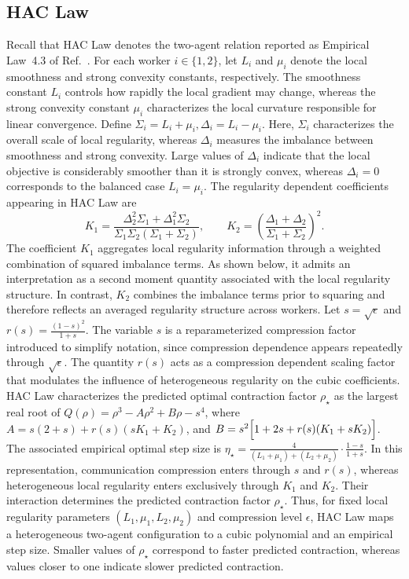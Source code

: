 \documentclass[mathematics,article,submit,moreauthors]{Definitions/mdpi}
\begin{document}
\subsection{HAC Law} \label{sec:hac-law} Recall that HAC Law denotes
the two-agent relation reported as Empirical Law~4.3 of
Ref.~\cite{thomsen2026tight}. For each worker \(i\in\{1,2\}\), let
\(L_i\) and \(\mu_i\) denote the local smoothness and strong convexity
constants, respectively. The smoothness constant \(L_i\) controls how rapidly the local gradient may change, whereas the strong convexity constant \(\mu_i\) characterizes the local curvature responsible for linear convergence. Define $\Sigma_i=L_i+\mu_i, \Delta_i=L_i-\mu_i$. Here, \(\Sigma_i\) characterizes the overall scale of local regularity, whereas \(\Delta_i\) measures the imbalance between smoothness and strong convexity. Large values of \(\Delta_i\) indicate that the local objective is considerably smoother than it is strongly convex, whereas \(\Delta_i=0\) corresponds to the balanced case \(L_i=\mu_i\). The regularity dependent coefficients appearing in HAC Law are \[ K_1= \frac{\Delta_2^2\Sigma_1+\Delta_1^2\Sigma_2} {\Sigma_1\Sigma_2(\Sigma_1+\Sigma_2)}, \qquad K_2= \left( \frac{\Delta_1+\Delta_2} {\Sigma_1+\Sigma_2} \right)^2. \] The coefficient \(K_1\) aggregates local regularity information through a weighted combination of squared imbalance terms. As shown below, it admits an interpretation as a second moment quantity associated with the local regularity structure. In contrast, \(K_2\) combines the imbalance terms prior to squaring and therefore reflects an averaged regularity structure across workers. Let $s=\sqrt{\epsilon}$ and $r(s)=\frac{(1-s)^2}{1+s}$. The variable \(s\) is a reparameterized compression factor introduced to simplify notation, since compression dependence appears repeatedly through \(\sqrt{\epsilon}\). The quantity \(r(s)\) acts as a compression dependent scaling factor that modulates the influence of heterogeneous regularity on the cubic coefficients. HAC Law characterizes the predicted optimal contraction factor \(\rho_\star\) as the largest real root of $Q(\rho) = \rho^3-A\rho^2+B\rho-s^4$, where $A = s(2+s) + r(s)(sK_1+K_2)$, and $B = s^2 \Bigl[ 1+2s+r(s)(K_1+sK_2) \Bigr]$. The associated empirical optimal step size is $\eta_\star = \frac{4} {(L_1+\mu_1)+(L_2+\mu_2)} \cdot \frac{1-s}{1+s}$. In this representation, communication compression enters through \(s\) and \(r(s)\), whereas heterogeneous local regularity enters exclusively through \(K_1\) and \(K_2\). Their interaction determines the predicted contraction factor \(\rho_\star\). Thus, for fixed local regularity parameters \((L_1,\mu_1,L_2,\mu_2)\) and compression level \(\epsilon\), HAC Law maps a heterogeneous two-agent configuration to a cubic polynomial and an empirical step size. Smaller values of \(\rho_\star\) correspond to faster predicted contraction, whereas values closer to one indicate slower predicted contraction. 
\end{document}
